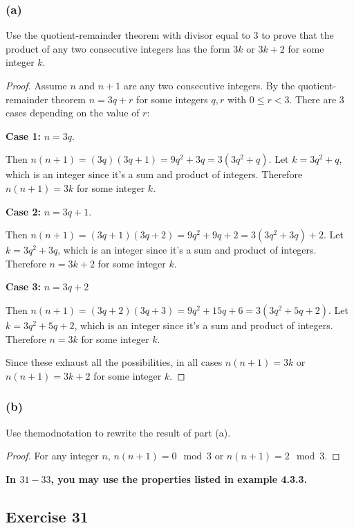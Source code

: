 \documentclass[14pt]{extarticle}
\newcommand{\cy}{\color{cyan}}
\begin{document}
\subsubsection{(a)}
Use the quotient-remainder theorem with divisor equal to 3 to prove that the product of any two consecutive integers has the form $3k$ or $3k + 2$ for some integer $k$.

\begin{proof}
Assume $n$ and $n+1$ are any two consecutive integers. By the quotient-remainder theorem $n = 3q+r$ for some integers $q,r$ with $0 \leq r < 3$. There are 3 cases depending on the value of $r$:

{\bf Case 1:} $n = 3q$.

Then $n(n+1) = (3q)(3q+1) = 9q^2 + 3q = 3(3q^2 + q)$. Let $k = 3q^2 + q$, which is an integer since it's a sum and product of integers. Therefore $n(n+1) = 3k$ for some integer $k$.

{\bf Case 2:} $n = 3q + 1$.

Then $n(n+1) = (3q+1)(3q+2) = 9q^2 + 9q + 2 = 3(3q^2 + 3q) + 2$. Let $k = 3q^2 + 3q$, which is an integer since it's a sum and product of integers. Therefore $n = 3k + 2$ for some integer $k$.

{\bf Case 3:} $n = 3q + 2$

Then $n(n+1) = (3q+2)(3q+3) = 9q^2 + 15q + 6 = 3(3q^2 + 5q + 2)$. Let $k = 3q^2 + 5q + 2$, which is an integer since it's a sum and product of integers. Therefore $n = 3k$ for some integer $k$.

Since these exhaust all the possibilities, in all cases $n(n+1) = 3k$ or $n(n+1) = 3k+2$ for some integer $k$.
\end{proof}

\subsubsection{(b)}
Use the$ $mod$ $notation to rewrite the result of part (a).

\begin{proof}
For any integer $n$, $n(n+1) = 0 \mod 3$ or $n(n+1) = 2 \mod 3$.
\end{proof}

{\bf \cy In $31-33$, you may use the properties listed in example 4.3.3.}

\subsection{Exercise 31}
\end{document}
